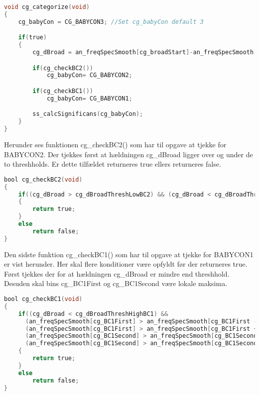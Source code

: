 \begin{lstlisting}[language=C,numbers=none]
void cg_categorize(void)
{
    cg_babyCon = CG_BABYCON3; //Set cg_babyCon default 3

    if(true)
    {
        cg_dBroad = an_freqSpecSmooth[cg_broadStart]-an_freqSpecSmooth[cg_broadEnd];

        if(cg_checkBC2())
            cg_babyCon= CG_BABYCON2;

        if(cg_checkBC1())
            cg_babyCon= CG_BABYCON1;

        ss_calcSignificans(cg_babyCon);
    }
}
\end{lstlisting}

Herunder ses funktionen cg\_checkBC2() som har til opgave at tjekke for BABYCON2. 
Der tjekkes først at hældningen cg\_dBroad ligger over og under de to threshholds. Er dette tilfældet returneres true ellers returneres false. 

\begin{lstlisting}[language=C,numbers=none]
bool cg_checkBC2(void)
{
    if((cg_dBroad > cg_dBroadThreshLowBC2) && (cg_dBroad < cg_dBroadThreshHighBC2))
    {
        return true;
    }
    else
        return false;
}
\end{lstlisting}

Den sidste funktion cg\_checkBC1() som har til opgave at tjekke for BABYCON1 er vist herunder. 
Her skal flere konditioner være opfyldt før der returneres true. Først tjekkes der for at hældningen cg\_dBroad er mindre end threshhold. Desuden skal bins cg\_BC1First og cg\_BC1Second være lokale maksima. 

\begin{lstlisting}[language=C,numbers=none]
bool cg_checkBC1(void)
{
    if((cg_dBroad < cg_dBroadThreshHighBC1) &&
	  (an_freqSpecSmooth[cg_BC1First] > an_freqSpecSmooth[cg_BC1First - cg_margin]) &&
	  (an_freqSpecSmooth[cg_BC1First] > an_freqSpecSmooth[cg_BC1First + cg_margin]) &&
	  (an_freqSpecSmooth[cg_BC1Second] > an_freqSpecSmooth[cg_BC1Second - cg_margin]) &&
	  (an_freqSpecSmooth[cg_BC1Second] > an_freqSpecSmooth[cg_BC1Second + cg_margin]))
    {
        return true;
    }
    else
        return false;
}
\end{lstlisting}
